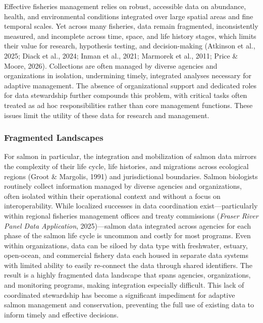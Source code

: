\documentclass[
  letterpaper,
  DIV=11,
  numbers=noendperiod]{scrartcl}
\begin{document}
Effective fisheries management relies on robust, accessible data on
abundance, health, and environmental conditions integrated over large
spatial areas and fine temporal scales. Yet across many fisheries, data
remain fragmented, inconsistently measured, and incomplete across time,
space, and life history stages, which limits their value for research,
hypothesis testing, and decision-making (Atkinson et al., 2025; Diack et
al., 2024; Inman et al., 2021; Marmorek et al., 2011; Price \& Moore,
2026). Collections are often managed by diverse agencies and
organizations in isolation, undermining timely, integrated analyses
necessary for adaptive management. The absence of organizational support
and dedicated roles for data stewardship further compounds this problem,
with critical tasks often treated as ad hoc responsibilities rather than
core management functions. These issues limit the utility of these data
for research and management.

\subsubsection{Fragmented Landscapes}\label{fragmented-landscapes}

For salmon in particular, the integration and mobilization of salmon
data mirrors the complexity of their life cycle, life histories, and
migrations across ecological regions (Groot \& Margolis, 1991) and
jurisdictional boundaries. Salmon biologists routinely collect
information managed by diverse agencies and organizations, often
isolated within their operational context and without a focus on
interoperability. While localized successes in data coordination
exist---particularly within regional fisheries management offices and
treaty commissions (\emph{Fraser {River} {Panel} {Data} {Application}},
2025)---salmon data integrated across agencies for each phase of the
salmon life cycle is uncommon and costly for most programs. Even within
organizations, data can be siloed by data type with freshwater, estuary,
open-ocean, and commercial fishery data each housed in separate data
systems with limited ability to easily re-connect the data through
shared identifiers. The result is a highly fragmented data landscape
that spans agencies, organizations, and monitoring programs, making
integration especially difficult. This lack of coordinated stewardship
has become a significant impediment for adaptive salmon management and
conservation, preventing the full use of existing data to inform timely
and effective decisions.
\end{document}
